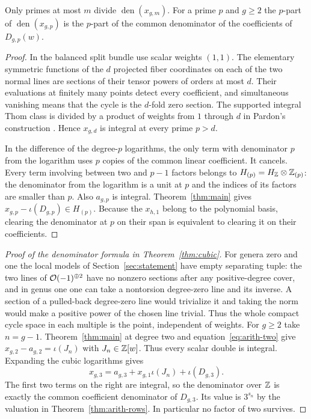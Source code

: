 \begin{proposition}
Only primes at most $m$ divide $\operatorname{den}(x_{g,m})$.
For a prime $p$ and $g\ge2$ the $p$-part of
$\operatorname{den}(x_{g,p})$ is the $p$-part of the common
denominator of the coefficients of $D_{g,p}(w)$.
\end{proposition}

\begin{proof}
In the balanced split bundle use scalar weights $(1,1)$. The
elementary symmetric functions of the $d$ projected fiber coordinates on each
of the two normal lines are sections of their tensor powers of
orders at most $d$. Their evaluations at finitely many points
detect every coefficient, and simultaneous vanishing means that
the cycle is the $d$-fold zero section. The supported integral
Thom class is divided by a product of weights from $1$ through $d$
in Pardon's construction \cite[Definition~4.7]{Pardon}.
Hence $x_{g,d}$ is integral at every prime $p>d$.

In the difference of the degree-$p$ logarithms, the only term
with denominator $p$ from the logarithm uses $p$ copies of the common
linear coefficient. It cancels. Every term involving between two
and $p-1$ factors belongs to
$H_{(p)}=H_{\mathbb Z}\otimes\mathbb Z_{(p)}$: the denominator from the logarithm is a
unit at $p$ and the indices of its factors are smaller than $p$.
Also $a_{g,p}$ is integral. Theorem~\ref{thm:main} gives
$x_{g,p}-\iota(D_{g,p})\in H_{(p)}$. Because the $x_{h,1}$ belong
to the polynomial basis, clearing the denominator at $p$ on their
span is equivalent to clearing it on their coefficients.
\end{proof}

\begin{proof}[Proof of the denominator formula in Theorem~\ref{thm:cubic}]
For genera zero and one the local models of Section~\ref{sec:statement}
have empty separating tuple: the two lines of $\mathcal O(-1)^{\oplus2}$
have no nonzero sections after any positive-degree cover, and in genus
one one can take a nontorsion degree-zero line and its inverse. A
section of a pulled-back degree-zero line would trivialize it and
taking the norm would make a positive power of the chosen line
trivial. Thus the whole compact cycle space in each multiple is the
point, independent of weights. For $g\ge2$ take $n=g-1$.
Theorem~\ref{thm:main} at degree two and equation~\eqref{eq:arith-two}
give $x_{g,2}-a_{g,2}=\iota(J_n)$ with $J_n\in\mathbb Z[w]$.
Thus every scalar double is integral. Expanding
the cubic logarithms gives
\[
 x_{g,3}=a_{g,3}+x_{g,1}\iota(J_n)+\iota(D_{g,3}).
\]
The first two terms on the right are integral, so the denominator
over $\mathbb Z$ is exactly the common coefficient denominator of
$D_{g,3}$. Its value is $3^{s_n}$ by the valuation in Theorem~\ref{thm:arith-rows}. In particular no factor of two
survives.
\end{proof}


